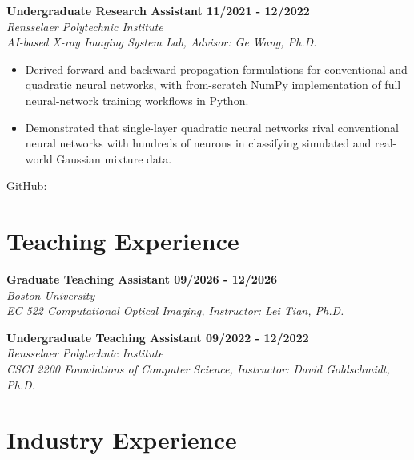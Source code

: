 \documentclass[letterpaper, 11pt]{article}
\newcommand{\subsectionvspace}{\vspace{8pt}}
\begin{document}
    \textbf{Undergraduate Research Assistant \hfill 11/2021 - 12/2022} \\
    \textit{Rensselaer Polytechnic Institute} \\
    \textit{AI-based X-ray Imaging System Lab, Advisor: Ge Wang, Ph.D.}
    \begin{itemize}
        \item Derived forward and backward propagation formulations for conventional and quadratic neural networks, with from-scratch NumPy implementation of full neural-network training workflows in Python.
        \item Demonstrated that single-layer quadratic neural networks rival conventional neural networks with hundreds of neurons in classifying simulated and real-world Gaussian mixture data.
    \end{itemize}
    GitHub: \href{https://github.com/tianrui-qi/QuadraticNeurons}{}


\section{Teaching Experience}


    \textbf{Graduate Teaching Assistant \hfill 09/2026 - 12/2026} \\
    \textit{Boston University} \\
    \textit{EC 522 Computational Optical Imaging, Instructor: Lei Tian, Ph.D.}

    \subsectionvspace

    \textbf{Undergraduate Teaching Assistant \hfill 09/2022 - 12/2022} \\
    \textit{Rensselaer Polytechnic Institute} \\
    \textit{CSCI 2200 Foundations of Computer Science, Instructor: David Goldschmidt, Ph.D.}


\section{Industry Experience}
\end{document}
